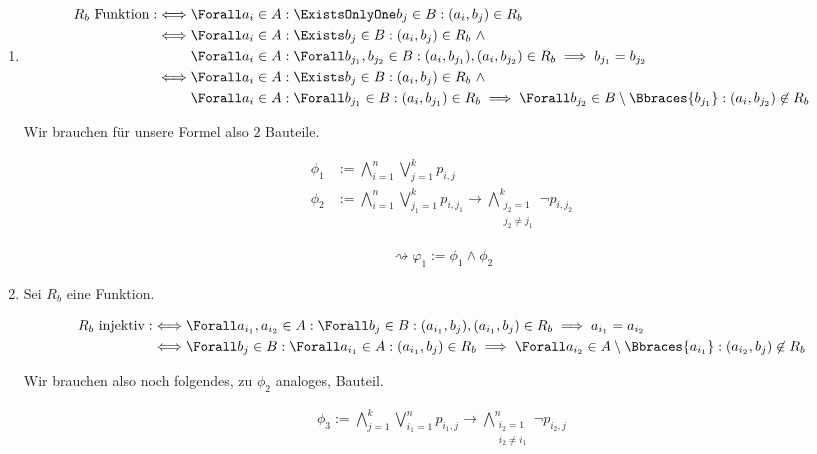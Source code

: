 \begin{solution}
\begin{enumerate}[label = \arabic*.]
  \item

  \begin{align*}
    R_b ~\text{Funktion}
    :\iff
    & \Forall a_i \in A:
    \ExistsOnlyOne b_j \in B:
    (a_i, b_j) \in R_b \\
    \iff
    & \Forall a_i \in A:
    \Exists b_j \in B:
    (a_i, b_j) \in R_b
    ~ \land \\
    & \Forall a_i \in A:
    \Forall b_{j_1}, b_{j_2} \in B:
    (a_i, b_{j_1}), (a_i, b_{j_2}) \in R_b
    \implies
    b_{j_1} = b_{j_2} \\
    \iff
    & \Forall a_i \in A:
    \Exists b_j \in B:
    (a_i, b_j) \in R_b
    ~ \land \\
    & \Forall a_i \in A:
    \Forall b_{j_1} \in B:
    (a_i, b_{j_1}) \in R_b
    \implies
    \Forall b_{j_2} \in B \setminus \Bbraces{b_{j_1}}:
    (a_i, b_{j_2}) \not \in R_b
  \end{align*}

  Wir brauchen für unsere Formel also $2$ Bauteile.

  \begin{align*}
    \phi_1
    & :=
    \bigwedge_{i=1}^n \bigvee_{j=1}^kp_{i,j} \\
    \phi_2
    & :=
    \bigwedge_{i=1}^n \bigvee_{j_1=1}^kp_{i,j_1}
    \to
    \bigwedge_{\substack{j_2=1 \\ j_2\neq j_1}}^{k}\neg p_{i,j_2}
  \end{align*}

  \begin{align*}
    \rightsquigarrow
    \varphi_1 := \phi_1 \land \phi_2
  \end{align*}

  \item Sei $R_b$ eine Funktion.
  
  \begin{align*}
    R_b ~\text{injektiv}
    :\iff
    & \Forall a_{i_1}, a_{i_2} \in A:
    \Forall b_j \in B:
    (a_{i_1}, b_j), (a_{i_1}, b_j) \in R_b
    \implies
    a_{i_1} = a_{i_2} \\
    \iff
    & \Forall b_j \in B:
    \Forall a_{i_1} \in A:
    (a_{i_1}, b_j) \in R_b
    \implies
    \Forall a_{i_2} \in A \setminus \Bbraces{a_{i_1}}:
    (a_{i_2}, b_j) \not \in R_b
  \end{align*}

  Wir brauchen also noch folgendes, zu $\phi_2$ analoges, Bauteil.

  \begin{align*}
    \phi_3
    :=
    \bigwedge_{j=1}^k \bigvee_{i_1=1}^np_{i_1,j}
    \to
    \bigwedge_{\substack{i_2=1 \\ i_2\neq i_1}}^{n}\neg p_{i_2,j}
  \end{align*}


\end{enumerate}
\end{solution}
